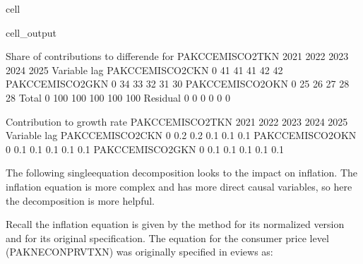 \documentclass[letterpaper,10pt,english]{jupyterBook}
\begin{document}
\begin{sphinxuseclass}{cell}
\begin{sphinxVerbatimOutput}
\begin{sphinxuseclass}{cell_output}
\begin{sphinxVerbatim}[commandchars=\\\{\}]
 Share of contributions to differende for  PAKCCEMISCO2TKN
                           2021        2022        2023        2024        2025
Variable        lag                                                            
PAKCCEMISCO2CKN 0           41\PYGZpc{}         41\PYGZpc{}         41\PYGZpc{}         42\PYGZpc{}         42\PYGZpc{}
PAKCCEMISCO2GKN 0           34\PYGZpc{}         33\PYGZpc{}         32\PYGZpc{}         31\PYGZpc{}         30\PYGZpc{}
PAKCCEMISCO2OKN 0           25\PYGZpc{}         26\PYGZpc{}         27\PYGZpc{}         28\PYGZpc{}         28\PYGZpc{}
Total           0          100\PYGZpc{}        100\PYGZpc{}        100\PYGZpc{}        100\PYGZpc{}        100\PYGZpc{}
Residual        0            0\PYGZpc{}          0\PYGZpc{}          0\PYGZpc{}          0\PYGZpc{}         \PYGZhy{}0\PYGZpc{}

 Contribution to growth rate PAKCCEMISCO2TKN
                           2021        2022        2023        2024        2025
Variable        lag                                                            
PAKCCEMISCO2CKN 0         \PYGZhy{}0.2\PYGZpc{}       \PYGZhy{}0.2\PYGZpc{}       \PYGZhy{}0.1\PYGZpc{}       \PYGZhy{}0.1\PYGZpc{}       \PYGZhy{}0.1\PYGZpc{}
PAKCCEMISCO2OKN 0         \PYGZhy{}0.1\PYGZpc{}       \PYGZhy{}0.1\PYGZpc{}       \PYGZhy{}0.1\PYGZpc{}       \PYGZhy{}0.1\PYGZpc{}       \PYGZhy{}0.1\PYGZpc{}
PAKCCEMISCO2GKN 0         \PYGZhy{}0.1\PYGZpc{}       \PYGZhy{}0.1\PYGZpc{}       \PYGZhy{}0.1\PYGZpc{}       \PYGZhy{}0.1\PYGZpc{}       \PYGZhy{}0.1\PYGZpc{}
\end{sphinxVerbatim}

\end{sphinxuseclass}\end{sphinxVerbatimOutput}

\end{sphinxuseclass}
\sphinxAtStartPar
The following single\sphinxhyphen{}equation decomposition looks to the impact on inflation.  The inflation equation is more complex and has more direct causal variables, so here the decomposition is more helpful.

\sphinxAtStartPar
Recall the inflation equation is given by the  method for its normalized version and  for its original specification.  The equation for the consumer price level (PAKNECONPRVTXN) was originally specified in eviews as:
\end{document}
